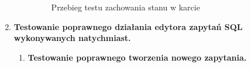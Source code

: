 \begin{enumerate}
\begin{enumerate}
\begin{figure}[h]



                    \caption{Przebieg testu zachowania stanu w karcie}
                    \label{stateRetentionManualTest}
                \end{figure}

                \FloatBarrier

        \end{enumerate}

    \item \textbf{Testowanie poprawnego działania edytora zapytań SQL
        wykonywanych natychmiast.}

        \begin{enumerate}

            \item \textbf{Testowanie poprawnego tworzenia nowego zapytania.}


\end{enumerate}
\end{enumerate}
